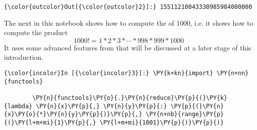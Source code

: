\begin{Verbatim}[commandchars=\\\{\}]
{\color{outcolor}Out[{\color{outcolor}2}]:} 15511210043330985984000000
\end{Verbatim}
            
    The next  in this notebook shows how to compute the
 of 1000, i.e. it shows how to compute the product
\[ 1000! = 1 * 2 * 3 * \cdots * 998 * 999 * 1000 \] It uses some
advanced features from  that will be
discussed at a later stage of this introduction.

    \begin{Verbatim}[commandchars=\\\{\}]
{\color{incolor}In [{\color{incolor}3}]:} \PY{k+kn}{import} \PY{n+nn}{functools} 
        
        \PY{n}{functools}\PY{o}{.}\PY{n}{reduce}\PY{p}{(}\PY{k}{lambda} \PY{n}{x}\PY{p}{,} \PY{n}{y}\PY{p}{:} \PY{p}{(}\PY{n}{x}\PY{o}{*}\PY{n}{y}\PY{p}{)}\PY{p}{,} \PY{n+nb}{range}\PY{p}{(}\PY{l+m+mi}{1}\PY{p}{,} \PY{l+m+mi}{1001}\PY{p}{)}\PY{p}{)}
\end{Verbatim}


